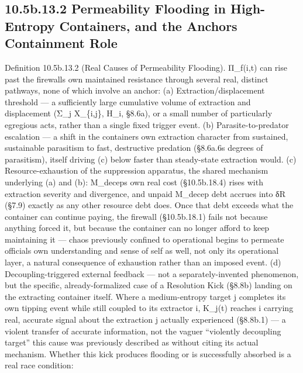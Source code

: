 \documentclass[
]{article}
\begin{document}
\hypertarget{b.13.2-permeability-flooding-in-high-entropy-containers-and-the-anchors-containment-role}{%
\subsection{10.5b.13.2 Permeability Flooding in High-Entropy Containers,
and the Anchor\textquotesingle s Containment
Role}\label{b.13.2-permeability-flooding-in-high-entropy-containers-and-the-anchors-containment-role}}

Definition 10.5b.13.2 (Real Causes of Permeability Flooding). Π\_f(i,t)
can rise past the firewall\textquotesingle s own maintained resistance
through several real, distinct pathways, none of which involve an
anchor: (a) Extraction/displacement threshold --- a sufficiently large
cumulative volume of extraction and displacement (Σ\_j X\_\{i,j\}, H\_i,
§8.6a), or a small number of particularly egregious acts, rather than a
single fixed trigger event. (b) Parasite-to-predator escalation --- a
shift in the container\textquotesingle s own extraction character from
sustained, sustainable parasitism to fast, destructive predation
(§8.6a.6\textquotesingle s degrees of parasitism), itself driving (c)
below faster than steady-state extraction would. (c) Resource-exhaustion
of the suppression apparatus, the shared mechanism underlying (a) and
(b): M\_decep\textquotesingle s own real cost (§10.5b.18.4) rises with
extraction severity and divergence, and unpaid M\_decep debt accrues
into δR (§7.9) exactly as any other resource debt does. Once that debt
exceeds what the container can continue paying, the firewall
(§10.5b.18.1) fails not because anything forced it, but because the
container can no longer afford to keep maintaining it --- chaos
previously confined to operational begins to permeate
official\textquotesingle s own understanding and sense of self as well,
not only its operational layer, a natural consequence of exhaustion
rather than an imposed event. (d) Decoupling-triggered external feedback
--- not a separately-invented phenomenon, but the specific,
already-formalized case of a Resolution Kick (§8.8b) landing on the
extracting container itself. Where a medium-entropy target j completes
its own tipping event while still coupled to its extractor i, K\_j(t)
reaches i carrying real, accurate signal about the extraction j actually
experienced (§8.8b.1) --- a violent transfer of accurate information,
not the vaguer ``violently decoupling target'' this cause was previously
described as without citing its actual mechanism. Whether this kick
produces flooding or is successfully absorbed is a real race condition:
\end{document}
